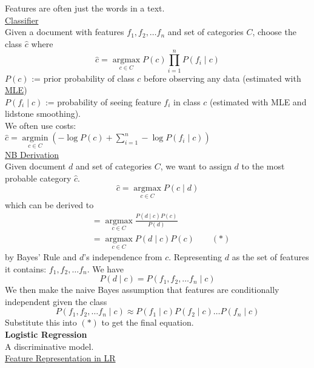 \documentclass[8pt]{extarticle} %
\begin{document}
\begin{multicols*}{3}
Features are often just the words in a text. \\

\underline{Classifier}\\

Given a document with features $f_1, f_2, \ldots f_n$ and set of categories $C$, choose the class $\hat{c}$ where
$$
\hat{c}=\underset{c \in C}{\operatorname{argmax}} P(c) \prod_{i=1}^n P\left(f_i \mid c\right)
$$
$P(c)$ := prior probability of class $c$ before observing any data 
(estimated with \underline{MLE})\\

$P\left(f_i \mid c\right)$ := probability of seeing feature $f_i$ in class $c$ (estimated with MLE and lidstone smoothing).\\

We often use costs: \\ 

$\hat{c}=\underset{c \in C}{\operatorname{argmin}}\left(-\log P(c)+\sum_{i=1}^n-\log P\left(f_i \mid c\right)\right)$\\

\underline{NB Derivation}\\

Given document $d$ and set of categories $C$, we want to assign $d$ to the most probable category $\hat{c}$.
$$
\hat{c}=\underset{c \in C}{\operatorname{argmax}} P(c \mid d)
$$
which can be derived to 
$$\begin{aligned} 
    & =\underset{c \in C}{\operatorname{argmax}} \frac{P(d \mid c) P(c)}{P(d)} \\ 
    & =\underset{c \in C}{\operatorname{argmax}} P(d \mid c) P(c)\qquad (*)
\end{aligned}
$$ 
by Bayes' Rule and $d$'s independence from $c$. 
Representing $d$ as the set of features it contains: $f_1, f_2, \ldots f_n$. We have
$$
P(d \mid c)=P\left(f_1, f_2, \ldots f_n \mid c\right)
$$
We then make the naive Bayes assumption that features are conditionally independent given the class
$$P\left(f_1, f_2, \ldots f_n \mid c\right) \approx P\left(f_1 \mid c\right) P\left(f_2 \mid c\right) \ldots P\left(f_n \mid c\right)$$
Substitute this into $(*)$ to get the final equation.\\

\textbf{Logistic Regression} \\

A discriminative model. \\

\underline{Feature Representation in LR}\\


\end{multicols*}
\end{document}
